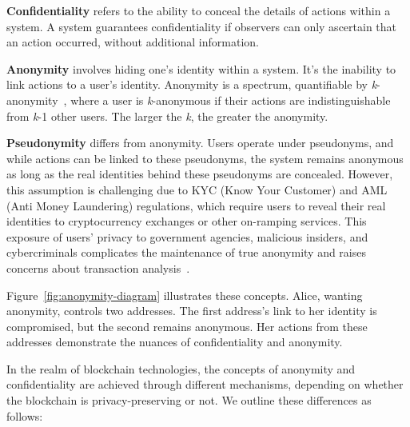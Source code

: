 \documentclass[pdftex,twocolumn,epjc3]{svjour3}
\begin{document}
\textbf{Confidentiality} refers to the ability to conceal the details of actions within a system. A system guarantees confidentiality if observers can only ascertain that an action occurred, without additional information.

\textbf{Anonymity} involves hiding one's identity within a system. It's the inability to link actions to a user's identity. Anonymity is a spectrum, quantifiable by \textit{k}-anonymity~\cite{sweeneyKanonymityModelProtecting2002}, where a user is \textit{k}-anonymous if their actions are indistinguishable from \textit{k}-1 other users. The larger the \textit{k}, the greater the anonymity.

\begin{sloppypar}
\textbf{Pseudonymity} differs from anonymity. Users operate under pseudonyms, and while actions can be linked to these pseudonyms, the system remains anonymous as long as the real identities behind these pseudonyms are concealed. However, this assumption is challenging due to KYC (Know Your Customer) and AML (Anti Money Laundering) regulations, which require users to reveal their real identities to cryptocurrency exchanges or other on-ramping services. This exposure of users' privacy to government agencies, malicious insiders, and cybercriminals complicates the maintenance of true anonymity and raises concerns about transaction analysis~\cite{androulakiEvaluatingUserPrivacy2013, oberStructureAnonymityBitcoin2013}.

Figure~\ref{fig:anonymity-diagram} illustrates these concepts. Alice, wanting anonymity, controls two addresses. The first address's link to her identity is compromised, but the second remains anonymous. Her actions from these addresses demonstrate the nuances of confidentiality and anonymity.
\end{sloppypar}

In the realm of blockchain technologies, the concepts of anonymity and confidentiality are achieved through different mechanisms, depending on whether the blockchain is privacy-preserving or not. We outline these differences as follows:
\end{document}
